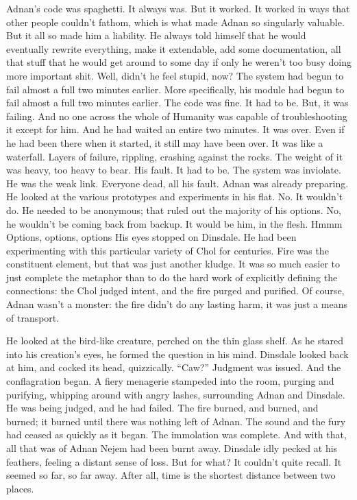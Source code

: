 \SmallVSpace
Adnan’s code was spaghetti. It always was. But it worked. It worked in ways that other people couldn’t fathom, which is what made Adnan so singularly valuable. But it all so made him a liability. He always told himself that he would eventually rewrite everything, make it extendable, add some documentation, all that stuff that he would get around to some day if only he weren’t too busy doing more important shit.
\SmallVSpace
Well, didn’t he feel stupid, now?
\SmallVSpace
The system had begun to fail almost a full two minutes earlier. More specifically, his module had begun to fail almost a full two minutes earlier. The code was fine. It had to be. But, it was failing. And no one across the whole of Humanity was capable of troubleshooting it except for him. And he had waited an entire two minutes. It was over. Even if he had been there when it started, it still may have been over.
\SmallVSpace
It was like a waterfall. Layers of failure, rippling, crashing against the rocks. The weight of it was heavy, too heavy to bear. His fault. It had to be. The system was inviolate. He was the weak link. Everyone dead, all his fault.
\SomeVSpace
Adnan was already preparing. He looked at the various prototypes and experiments in his flat. No. It wouldn’t do. He needed to be anonymous; that ruled out the majority of his options. No, he wouldn’t be coming back from backup. It would be him, in the flesh.
\SomeVSpace
Hmmm{\el} Options, options, options{\el}
\SomeVSpace
His eyes stopped on Dinsdale. He had been experimenting with this particular variety of Chol for centuries. Fire was the constituent element, but that was just another kludge. It was so much easier to just complete the metaphor than to do the hard work of explicitly defining the connections: the Chol judged intent, and the fire purged and purified. Of course, Adnan wasn’t a monster: the fire didn’t do any lasting harm, it was just a means of transport.

He looked at the bird-like creature, perched on the thin glass shelf. As he stared into his creation’s eyes, he formed the question in his mind. Dinsdale looked back at him, and cocked its head, quizzically.
\SmallVSpace
“Caw?”
\SmallVSpace
Judgment was issued. And the conflagration began. A fiery menagerie stampeded into the room, purging and purifying, whipping around with angry lashes, surrounding Adnan and Dinsdale. He was being judged, and he had failed. The fire burned, and burned, and burned; it burned until there was nothing left of Adnan. The sound and the fury had ceased as quickly as it began.
\SmallVSpace
The immolation was complete. And with that, all that was of Adnan Nejem had been burnt away.
\SomeVSpace
Dinsdale idly pecked at his feathers, feeling a distant sense of loss. But for what? It couldn’t quite recall. It seemed so far, so far away. After all, time is the shortest distance between two places.
\simpleline
{}

